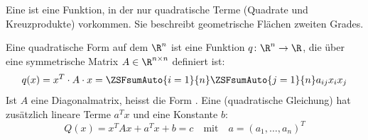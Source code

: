 \ZSFNewColumn
{}

\begin{runintext}
Eine  ist eine Funktion, in der nur quadratische Terme (Quadrate und Kreuzprodukte) vorkommen. Sie beschreibt geometrische Flächen zweiten Grades.
\end{runintext}


\begin{defbox}
Eine quadratische Form auf dem $\R^n$ ist eine Funktion $q \colon \R^n \to \R$, die über eine symmetrische Matrix $A \in \R^{n \times n}$ definiert ist:
\[ q(x) = x^T \cdot A \cdot x = \ZSFsumAuto{i=1}{n} \ZSFsumAuto{j=1}{n} a_{ij} x_i x_j \]
Ist $A$ eine Diagonalmatrix, heisst die Form .
\ZSFsep
Eine  (quadratische Gleichung) hat zusätzlich lineare Terme $a^T x$ und eine Konstante $b$:
\[ Q(x) = x^T A x + a^T x + b = c \quad \text{mit} \quad a = (a_1, \dots, a_n)^T \]
\end{defbox}

